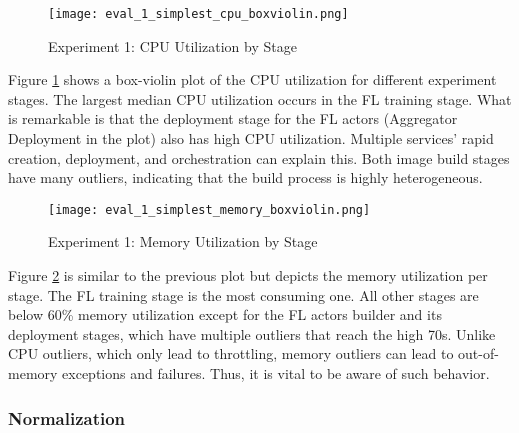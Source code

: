 \begin{figure}[h]
    \begin{adjustwidth}{-0.2\paperwidth}{-0.2\paperwidth}
        \centering
        \texttt{[image: eval\_1\_simplest\_cpu\_boxviolin.png]}
        \caption{Experiment 1: CPU Utilization by Stage}
        \label{fig:eval_1_simplest_cpu_boxviolin}
    \end{adjustwidth}
\end{figure}

Figure \ref{fig:eval_1_simplest_cpu_boxviolin} shows a box-violin plot of the CPU utilization for different experiment stages.
The largest median CPU utilization occurs in the FL training stage.
What is remarkable is that the deployment stage for the FL actors (Aggregator Deployment in the plot) also has high CPU utilization.
Multiple services' rapid creation, deployment, and orchestration can explain this.
Both image build stages have many outliers, indicating that the build process is highly heterogeneous.

\begin{figure}[h]
    \begin{adjustwidth}{-0.2\paperwidth}{-0.2\paperwidth}
        \centering
        \texttt{[image: eval\_1\_simplest\_memory\_boxviolin.png]}
        \caption{Experiment 1: Memory Utilization by Stage}
        \label{fig:eval_1_simplest_memory_boxviolin}
    \end{adjustwidth}
\end{figure}

Figure \ref{fig:eval_1_simplest_memory_boxviolin} is similar to the previous plot but depicts the memory utilization per stage.
The FL training stage is the most consuming one.
All other stages are below 60\% memory utilization except for the FL actors builder and its deployment stages, which have multiple outliers that reach the high 70s.
Unlike CPU outliers, which only lead to throttling, memory outliers can lead to out-of-memory exceptions and failures.
Thus, it is vital to be aware of such behavior.

\pagebreak
\subsubsection{Normalization}

